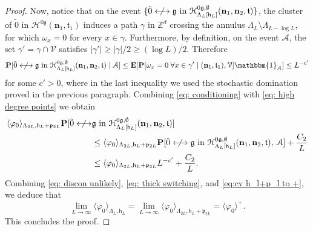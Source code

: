 \documentclass[11pt,a4paper]{article}
\theoremstyle{definition}
\numberwithin{equation}{section}
\newcommand\n{\mathbf{n}}
\newcommand\fg{\mathfrak{g}}
\newcommand\ft{\mathfrak{t}}
\newcommand\Z{\mathbb{Z}}
\begin{document}
\begin{proof}
Now, notice that on the event $\{\tilde 0\centernot\longleftrightarrow \fg\text{ in }\mathcal{H}_{\Lambda_L[\mathsf{h}_L]}^{0\fg,\emptyset}(\n_1,\n_2,\ft)\}$, the cluster of $\tilde{0}$ in $\mathcal{H}^{0\fg}(\n_1,\ft_1)$ induces a path $\gamma$ in $\Z^d$ crossing the annulus $\Lambda_L\setminus\Lambda_{L-\log L}$, for which $\omega_x=0$ for every $x\in\gamma$. Furthermore, by definition, on the event $\mathcal{A}$, the set $\gamma'=\gamma\cap\mathcal{V}$ satisfies $|\gamma'|\geq |\gamma|/2\geq (\log L)/2$. Therefore 
\begin{equation}\label{eq: conditioning}
\mathbf{P}[\tilde 0\centernot\longleftrightarrow \fg\text{ in }\mathcal{H}_{\Lambda_L[\mathsf{h}_L]}^{0\fg,\emptyset}(\n_1,\n_2,\ft)\mid \mathcal{A}]\leq \mathbf{E}[\mathbf{P}[\omega_x=0 \; \forall x\in\gamma' \mid  (\n_1,\ft_1), \mathcal{V}]\mathbbm{1}_{\mathcal{A}}]  \leq L^{-c'} 
\end{equation}
for some $c'>0$, where in the last inequality we used the stochastic domination proved in the previous paragraph.
Combining \eqref{eq: conditioning} with \eqref{eq: high degree points} we obtain
\begin{align}
\langle \varphi_0\rangle_{\Lambda_{2L},\mathsf{h}_L+\mathfrak{p}_{2L}}\mathbf{P}[\tilde 0\centernot\longleftrightarrow &\fg\text{ in }\mathcal{H}_{\Lambda_L[\mathsf{h}_L]}^{0\fg,\emptyset}(\n_1,\n_2,\ft)]\notag
\\&\leq \langle\varphi_0\rangle_{\Lambda_{2L},\mathsf{h}_L+\mathfrak{p}_{2L}}\mathbf{P}[\tilde 0\centernot\longleftrightarrow \fg\text{ in }\mathcal{H}_{\Lambda_L[\mathsf{h}_L]}^{0\fg,\emptyset}(\n_1,\n_2,\ft),\: \mathcal{A}]+\frac{C_2}{L}\notag
\\&\leq \langle\varphi_0\rangle_{\Lambda_{2L},\mathsf{h}_L+\mathfrak{p}_{2L}}L^{-c'}+\frac{C_2}{L}.\label{eq: discon unlikely}
\end{align}
Combining \eqref{eq: discon unlikely}, \eqref{eq: thick switching}, and \eqref{eq:cv h_l+p_l to +}, we deduce that 
\begin{equation}
\lim_{L\rightarrow \infty} \langle \varphi_0\rangle_{\Lambda_L,\mathsf{h}_L}=\lim_{L\rightarrow \infty} \langle \varphi_0\rangle_{\Lambda_{2L},\mathsf{h}_L+\mathfrak{p}_{2L}}=\langle \varphi_0\rangle^+.
\end{equation}
This concludes the proof.
\end{proof}
\end{document}
